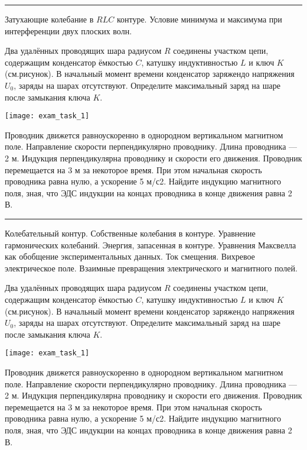 \documentclass[a5paper, landscape]{exam}
\begin{document}
\newpage

\rule{1\textwidth}{0.4pt}
\begin{questions}
\question Затухающие колебание в $RLC$ контуре. 
\question   Условие минимума и максимума при интерференции двух плоских волн.
 
\question Два удалённых проводящих шара радиусом $R$ соединены участком цепи, содержащим конденсатор ёмкостью $C$, катушку индуктивностью $L$ и ключ $K$(см.рисунок). В начальный момент времени конденсатор заряжендо напряжения $U_0$, заряды на шарах отсутствуют. Определите максимальный заряд на шаре после замыкания ключа $K$.

\texttt{[image: exam\_task\_1]}


\question Проводник движется равноускоренно в однородном вертикальном магнитном поле. Направление скорости перпендикулярно проводнику. Длина проводника — 2 м. Индукция перпендикулярна проводнику и скорости его движения. Проводник перемещается на 3 м за некоторое время. При этом начальная скорость проводника равна нулю, а ускорение 5 м/с2. Найдите индукцию магнитного поля, зная, что ЭДС индукции на концах проводника в конце движения равна 2 В.
\end{questions}

\newpage

\rule{1\textwidth}{0.4pt}
\begin{questions}
\question Колебательный контур. Собственные колебания в контуре. Уравнение гармонических колебаний. Энергия, запасенная в контуре. 
\question Уравнения Максвелла как обобщение экспериментальных данных. Ток смещения. Вихревое электрическое поле. Взаимные превращения электрического и магнитного полей.
 
\question Два удалённых проводящих шара радиусом $R$ соединены участком цепи, содержащим конденсатор ёмкостью $C$, катушку индуктивностью $L$ и ключ $K$(см.рисунок). В начальный момент времени конденсатор заряжендо напряжения $U_0$, заряды на шарах отсутствуют. Определите максимальный заряд на шаре после замыкания ключа $K$.

\texttt{[image: exam\_task\_1]}


\question Проводник движется равноускоренно в однородном вертикальном магнитном поле. Направление скорости перпендикулярно проводнику. Длина проводника — 2 м. Индукция перпендикулярна проводнику и скорости его движения. Проводник перемещается на 3 м за некоторое время. При этом начальная скорость проводника равна нулю, а ускорение 5 м/с2. Найдите индукцию магнитного поля, зная, что ЭДС индукции на концах проводника в конце движения равна 2 В.
\end{questions}
\newpage
\end{document}
